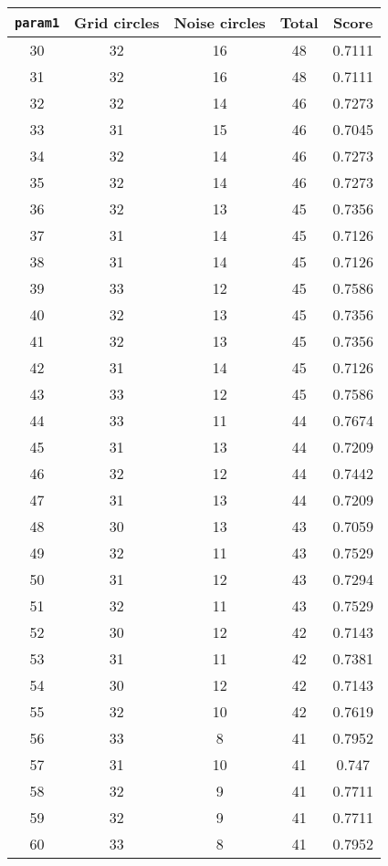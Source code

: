 \documentclass[letterpaper, 12pt]{article}
\begin{document}
\begin{longtable}{|c|c|c|c|c|}
\hline
\textbf{\texttt{param1}} & \textbf{Grid circles} & \textbf{Noise circles} & \textbf{Total} & \textbf{Score} \\
\hline
30 & 32 & 16 & 48 & 0.7111 \\
\hline
31 & 32 & 16 & 48 & 0.7111 \\
\hline
32 & 32 & 14 & 46 & 0.7273 \\
\hline
33 & 31 & 15 & 46 & 0.7045 \\
\hline
34 & 32 & 14 & 46 & 0.7273 \\
\hline
35 & 32 & 14 & 46 & 0.7273 \\
\hline
36 & 32 & 13 & 45 & 0.7356 \\
\hline
37 & 31 & 14 & 45 & 0.7126 \\
\hline
38 & 31 & 14 & 45 & 0.7126 \\
\hline
39 & 33 & 12 & 45 & 0.7586 \\
\hline
40 & 32 & 13 & 45 & 0.7356 \\
\hline
41 & 32 & 13 & 45 & 0.7356 \\
\hline
42 & 31 & 14 & 45 & 0.7126 \\
\hline
43 & 33 & 12 & 45 & 0.7586 \\
\hline
44 & 33 & 11 & 44 & 0.7674 \\
\hline
45 & 31 & 13 & 44 & 0.7209 \\
\hline
46 & 32 & 12 & 44 & 0.7442 \\
\hline
47 & 31 & 13 & 44 & 0.7209 \\
\hline
48 & 30 & 13 & 43 & 0.7059 \\
\hline
49 & 32 & 11 & 43 & 0.7529 \\
\hline
50 & 31 & 12 & 43 & 0.7294 \\
\hline
51 & 32 & 11 & 43 & 0.7529 \\
\hline
52 & 30 & 12 & 42 & 0.7143 \\
\hline
53 & 31 & 11 & 42 & 0.7381 \\
\hline
54 & 30 & 12 & 42 & 0.7143 \\
\hline
55 & 32 & 10 & 42 & 0.7619 \\
\hline
56 & 33 & 8 & 41 & 0.7952 \\
\hline
57 & 31 & 10 & 41 & 0.747 \\
\hline
58 & 32 & 9 & 41 & 0.7711 \\
\hline
59 & 32 & 9 & 41 & 0.7711 \\
\hline
60 & 33 & 8 & 41 & 0.7952 \\

\end{longtable}
\end{document}
